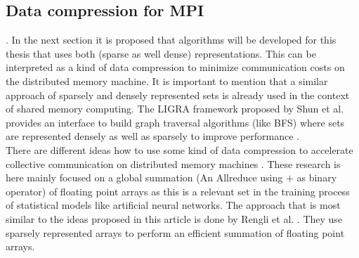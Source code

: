 \documentclass[a4paper,%
	12pt,%
	DIV14,
	headsepline,%
	headings=normal,
]{scrartcl}
\theoremstyle{definition}
\theoremstyle{remark}
\begin{document}
\subsection{Data compression for MPI}.
In the next section it is proposed that algorithms will be developed for this thesis that uses both (sparse as well dense) representations. This can be interpreted as a kind of data compression to minimize communication costs on the distributed memory machine. It is important to mention that a similar approach of sparsely and densely represented sets is already used in the context of shared memory computing. The LIGRA framework proposed by Shun et al. provides an interface to build graph traversal  algorithms (like BFS) where sets are represented densely as well as sparsely to improve performance \cite{Ligra}.\\
There are different ideas how to use some kind of data compression to accelerate collective communication on distributed memory machines \cite{compOnlinePipelining, compCountSketchAllreduce, compQuantizationAndSparseAllred}. These research is here mainly focused on a global summation (An Allreduce using $+$ as binary operator) of floating point arrays as this is a relevant set in the training process of statistical models like artificial neural networks. The approach that is most similar to the ideas proposed in this article is done by Rengli et al. \cite{compSparseDense}. They use sparsely represented arrays to perform an efficient summation of floating point arrays.
\end{document}
